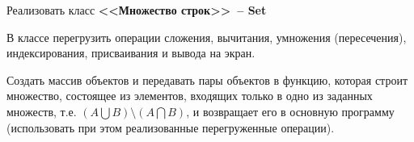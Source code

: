 
Реализовать класс \textbf{<<Множество строк>>~-- Set}

В классе перегрузить операции сложения, вычитания,
умножения (пересечения), индексирования, присваивания и вывода на экран.

Создать
массив объектов и передавать пары объектов в функцию, которая строит множество,
состоящее из элементов, входящих только в одно из заданных множеств,
т.е. $(A\bigcup B) \setminus (A\bigcap B)$, и возвращает его в основную программу (использовать при этом
реализованные перегруженные операции).
